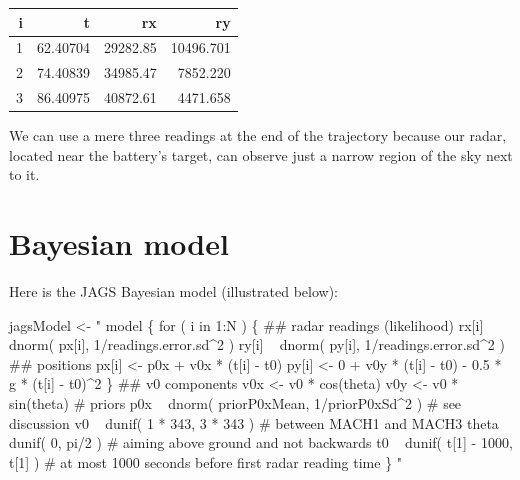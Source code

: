 \documentclass[]{article}
\newenvironment{Shaded}{\begin{snugshade}}{\end{snugshade}}
\newcommand{\NormalTok}[1]{#1}
\newcommand{\StringTok}[1]{\textcolor[rgb]{0.31,0.60,0.02}{#1}}
\begin{document}
\begin{longtable}[]{@{}rrrr@{}}
\toprule
i & t & rx & ry\tabularnewline
\midrule
\endhead
1 & 62.40704 & 29282.85 & 10496.701\tabularnewline
2 & 74.40839 & 34985.47 & 7852.220\tabularnewline
3 & 86.40975 & 40872.61 & 4471.658\tabularnewline
\bottomrule
\end{longtable}

We can use a mere three readings at the end of the trajectory because
our radar, located near the battery's target, can observe just a narrow
region of the sky next to it.

\hypertarget{bayesian-model}{%
\section{Bayesian model}\label{bayesian-model}}

Here is the JAGS Bayesian model (illustrated below):

\begin{Shaded}
\begin{Highlighting}[]
\NormalTok{jagsModel <-}\StringTok{ "}
\StringTok{model \{}
\StringTok{  for ( i in 1:N ) \{}
\StringTok{    ## radar readings (likelihood)}
\StringTok{    rx[i] ~ dnorm( px[i], 1/readings.error.sd^2 )}
\StringTok{    ry[i] ~ dnorm( py[i], 1/readings.error.sd^2 )}
\StringTok{    }
\StringTok{    ## positions }
\StringTok{    px[i] <- p0x + v0x * (t[i] - t0)}
\StringTok{    py[i] <-   0 + v0y * (t[i] - t0) - 0.5 * g * (t[i] - t0)^2}
\StringTok{  \}}
\StringTok{  }
\StringTok{  ## v0 components}
\StringTok{  v0x <- v0 * cos(theta)}
\StringTok{  v0y <- v0 * sin(theta)}
\StringTok{    }
\StringTok{  # priors   }
\StringTok{  p0x   ~ dnorm( priorP0xMean, 1/priorP0xSd^2 ) # see discussion}
\StringTok{  v0    ~ dunif( 1 * 343, 3 * 343 )  # between MACH1 and MACH3}
\StringTok{  theta ~ dunif( 0, pi/2 )           # aiming above ground and not backwards}
\StringTok{  t0    ~ dunif( t[1] - 1000, t[1] ) # at most 1000 seconds before first radar reading time}
\StringTok{\}}
\StringTok{"} 
\end{Highlighting}
\end{Shaded}
\end{document}
